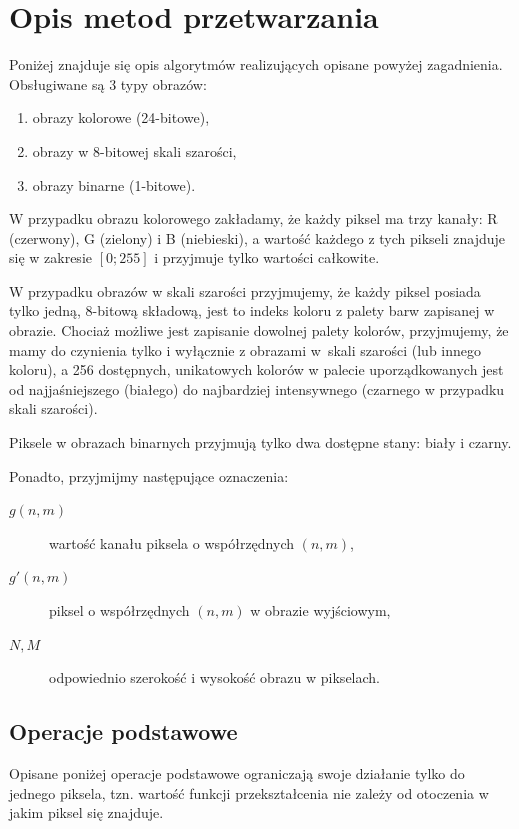 \documentclass{classrep}
\begin{document}
\section{Opis metod przetwarzania}

Poniżej znajduje się opis algorytmów realizujących opisane powyżej zagadnienia. Obsługiwane są 3 typy obrazów:
\begin{enumerate}
 \item obrazy kolorowe (24-bitowe),
 \item obrazy w 8-bitowej skali szarości,
 \item obrazy binarne (1-bitowe).
\end{enumerate}

W przypadku obrazu kolorowego zakładamy, że każdy piksel ma trzy kanały: R (czerwony), G (zielony) i B (niebieski), a wartość każdego z tych pikseli znajduje się w zakresie $[0; 255]$ i przyjmuje tylko wartości całkowite.

W przypadku obrazów w skali szarości przyjmujemy, że każdy piksel posiada tylko jedną, 8-bitową składową, jest to indeks koloru z palety barw zapisanej w obrazie. Chociaż możliwe jest zapisanie dowolnej palety kolorów, przyjmujemy, że mamy do czynienia tylko i wyłącznie z obrazami w~skali szarości (lub innego koloru), a 256 dostępnych, unikatowych kolorów w palecie uporządkowanych jest od najjaśniejszego (białego) do najbardziej intensywnego (czarnego \ppauza w przypadku skali szarości).

Piksele w obrazach binarnych przyjmują tylko dwa dostępne stany: biały i czarny.

Ponadto, przyjmijmy następujące oznaczenia:
\begin{description}
 \item[$g(n, m)$] wartość kanału piksela o współrzędnych $(n, m)$,
 \item[$g'(n, m)$] piksel o współrzędnych $(n, m)$ w obrazie wyjściowym,
 \item[$N, M$] odpowiednio szerokość i wysokość obrazu w pikselach.
\end{description}


\subsection{Operacje podstawowe}

Opisane poniżej operacje podstawowe ograniczają swoje działanie tylko do jednego piksela, tzn. wartość funkcji przekształcenia nie zależy od otoczenia w jakim piksel się znajduje.
\end{document}
